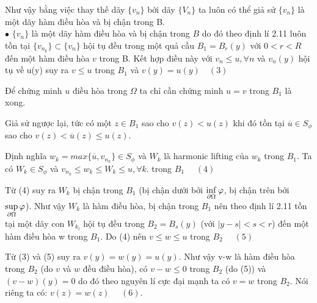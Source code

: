 Như vậy bằng việc thay thế dãy $\{v_n\}$ bởi dãy $\{V_n\}$ ta luôn có thể giả sử $\{v_n\}$ là một dãy hàm điều hòa và bị chận trong B.
\\
$ \bullet $ $\{v_n\}$ là một dãy hàm điều hòa và bị chận trong $B$ do đó theo định lí 2.11 luôn tồn tại $\{v_{n_k}\}\subset\{v_n\}$ hội tụ đều trong một quả cầu $B_1={B_r(y)}$ với $0<r<R$ đến một hàm điều hòa $v$ trong B.  Kết hợp điều này với $v_n\le u,\forall n$ và $v_n(y)$ hội tụ về u(y) suy ra $v\le u$ trong $B_1$ và $v(y)=u(y) \quad (3)$

Để chứng minh $u$ điều hòa trong $\Omega$ ta chỉ cần chứng minh $u=v$ trong $B_1$ là xong. 

Giả sử ngược lại, tức có một $z\in B_1$ sao cho $v(z)<u(z)$ khi đó tồn tại $\overline u\in S_\phi$ sao cho $v(z)<\overline u(z)\le u(z)$.

Định nghĩa $w_k=max\{\overline u,v_{n_k}\}\in S_\phi$ và $W_k$ là harmonic lifting của $w_k$ trong $B_1$. Ta có $W_k\in S_\phi$ và $v_{n_k}\le w_k\le W_k\le u,\forall k.$  trong $B_1$ $\quad (4)$

Từ (4) suy ra $W_k$ bị chận trong $B_1$ (bị chận dưới bởi $\mathop {{\rm{inf}}}\limits_{\partial \Omega } \varphi$, bị chận trên bởi $\mathop {{\rm{sup}}}\limits_{\partial \Omega } \varphi$). Như vậy $W_k$ là hàm điều hòa, bị chận trong $B_1$ nên theo định lí 2.11 tồn tại một dãy con $W_{k_l}$ hội tụ đều trong $B_2=B_s(y)$ (với  $\left| {y - s} \right| < s < r$) đến một hàm điều hòa w trong $B_1$. Do (4) nên $v\le w\le u$ trong $B_2$ $\quad (5)$

Từ (3) và (5) suy ra $v(y)=w(y)=u(y)$. Như vậy v-w là hàm điều hòa trong $B_2$ (do $v$ và $w$ đều điều hòa), có $v-w\le 0$ trong $B_2$ (do (5)) và $(v-w)(y)=0$ do đó theo nguyên lí cực đại mạnh ta có $v=w$ trong $B_2$. Nói riêng ta có: $v(z)=w(z)$ $\quad (6)$.

